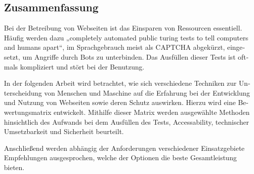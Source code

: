 \begin{otherlanguage}{ngerman}
	\chapter*{Zusammenfassung}
	Bei der Betreibung von Webseiten ist das Einsparen von Ressourcen essentiell. 
	Häufig werden dazu „completely automated public turing tests to tell computers and humans apart“, im Sprachgebrauch meist als CAPTCHA abgekürzt, eingesetzt, um Angriffe durch Bots zu unterbinden. 
	Das Ausfüllen dieser Tests ist oftmals kompliziert und stört bei der Benutzung.

	In der folgenden Arbeit wird betrachtet, wie sich verschiedene Techniken zur Unterscheidung von Menschen und Maschine auf die Erfahrung bei der Entwicklung und Nutzung von Webseiten sowie deren Schutz auswirken. 
	Hierzu wird eine Bewertungsmatrix entwickelt. 
	Mithilfe dieser Matrix werden ausgewählte Methoden hinsichtlich des Aufwands bei dem Ausfüllen des Tests, Accessability, technischer Umsetzbarkeit und Sicherheit beurteilt. 
	 
	Anschließend werden abhängig der Anforderungen verschiedener Einsatzgebiete Empfehlungen ausgesprochen, welche der Optionen die beste Gesamtleistung bieten.

\end{otherlanguage}
